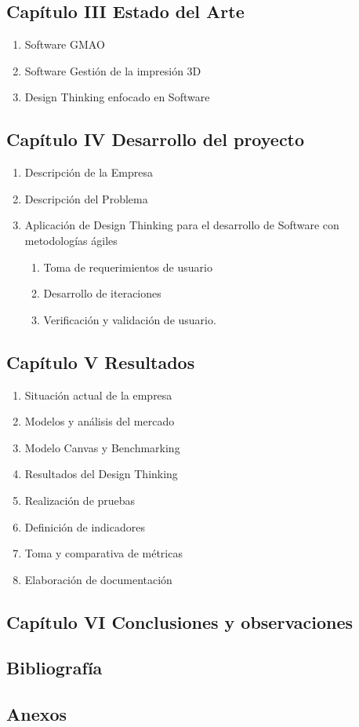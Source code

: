 \subsection{Capítulo III Estado del Arte}
	
		\begin{enumerate}
			\item Software GMAO
			\item Software Gestión de la impresión 3D
			\item Design Thinking enfocado en Software 
		\end{enumerate}
	
\subsection{Capítulo IV Desarrollo del proyecto}

		\begin{enumerate}
			\item Descripción de la Empresa 
			\item Descripción del Problema 
			\item Aplicación de Design Thinking para el desarrollo de Software con metodologías ágiles
				\begin{enumerate}
					\item Toma de requerimientos de usuario
					\item Desarrollo de iteraciones
					\item Verificación y validación de usuario.		
				\end{enumerate}		
		\end{enumerate}
		
		
\subsection{Capítulo V Resultados}
		
	
		\begin{enumerate}
			\item Situación actual de la empresa
			\item Modelos y análisis del mercado    
			\item Modelo Canvas y Benchmarking
			\item Resultados del Design Thinking
			\item Realización de pruebas
			\item Definición de indicadores
			\item Toma y comparativa de métricas 
			\item Elaboración de documentación 
		
		\end{enumerate}
		
\subsection{Capítulo VI Conclusiones y observaciones}

\subsection{Bibliografía}
\subsection{Anexos}
\clearpage	
	

